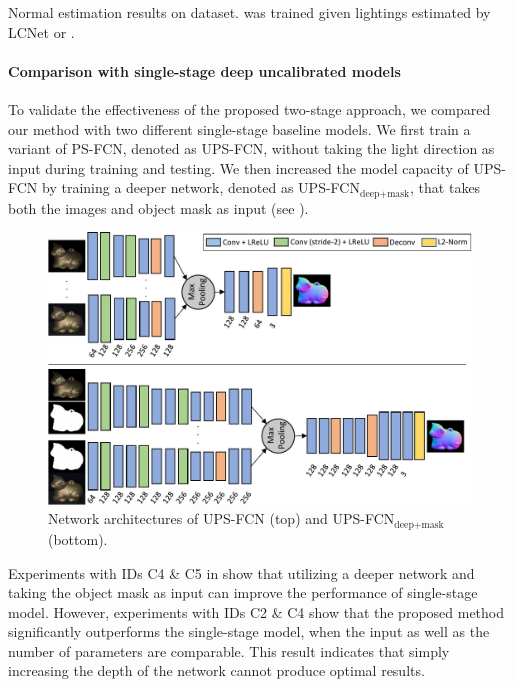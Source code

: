 \begin{table}[tbp] \centering
    \caption[Normal estimation results on \syntestMERL dataset]{Normal estimation results on \syntestMERL dataset. \PSFCNdag was trained given lightings estimated by LCNet or \LCNetreg.} %
     \label{tab:quant_normal_syn}
\end{table}


\paragraph{Comparison with single-stage deep uncalibrated models}
To validate the effectiveness of the proposed two-stage approach, we compared our method with two different single-stage baseline models.
We first train a variant of PS-FCN, denoted as UPS-FCN, without taking the light direction as input during training and testing.
We then increased the model capacity of UPS-FCN by training a deeper network, denoted as UPS-FCN$_{\text{deep+mask}}$, that takes both the images and object mask as input (see ). 

\begin{figure}[tbp] \centering
    \includegraphics[width=\textwidth]{ch-lcnet/images/Method/UPS-FCN_Variants}
    \caption[Network architectures of UPS-FCN and UPS-FCN$_{\text{deep+mask}}$.]{Network architectures of UPS-FCN (top) and UPS-FCN$_{\text{deep+mask}}$ (bottom).} \label{fig:upsfcn_model_variants}
\end{figure}

Experiments with IDs C4 \& C5 in  show that utilizing a deeper network and taking the object mask as input can improve the performance of single-stage model.
However, experiments with IDs C2 \& C4 show that the proposed method significantly outperforms the single-stage model, when the input as well as the number of parameters are comparable.
This result indicates that simply increasing the depth of the network cannot produce optimal results. 



